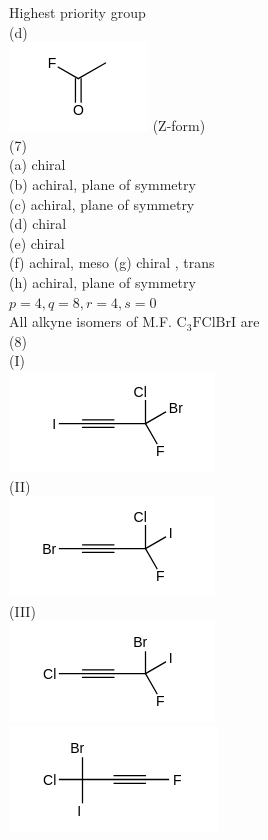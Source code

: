 \documentclass[10pt]{article}
\begin{document}
Highest priority group\\
(d)\\
\includegraphics{smile-c100cb77a0483e7b0b669a0dfa81b41e8142ffbf} (Z-form)\\
(7)\\
(a) chiral\\
(b) achiral, plane of symmetry\\
(c) achiral, plane of symmetry\\
(d) chiral\\
(e) chiral\\
(f) achiral, meso (g) chiral , trans\\
(h) achiral, plane of symmetry\\
$p=4, q=8, r=4, s=0$\\
All alkyne isomers of M.F. $\mathrm{C}_{3} \mathrm{FClBrI}$ are\\
(8)\\
(I)\\
\includegraphics{smile-90636f7ee53e878bd40197ad7f2078949db9f986}\\
(II)\\
\includegraphics{smile-8e4036ec51441fdae17b7c8d167166d16fe424f7}\\
(III)\\
\includegraphics{smile-fd517394f6995159a96e9b716b9d69cc3c58a7c4}\\
\includegraphics{smile-22606b75ffee7b71a9d543266f05555af0fde746}
\end{document}
